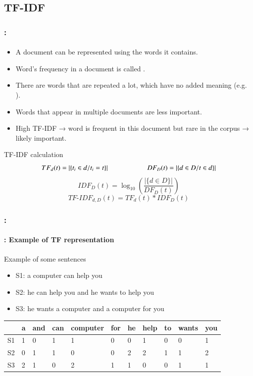 \documentclass[xcolor=table]{beamer}
\begin{document}
\subsection{TF-IDF}

\begin{frame}
	\frametitle{\insertshortsubtitle: \insertsection}
	\framesubtitle{\insertsubsection}

	\begin{itemize}
		\item A document can be represented using the words it contains.
		\item Word's frequency in a document is called .
		\item There are words that are repeated a lot, which have no added meaning (e.g. ).
		\item Words that appear in multiple documents are less important.
		\item High TF-IDF → word is frequent in this document but rare in the corpus → likely important.
	\end{itemize}
	
	\begin{block}{TF-IDF calculation}
		\[
		TF_d(t) =  |\{t_i \in d / t_i = t\}|
		\hskip2cm 
		DF_D(t) = |\{d \in D / t \in d\}|
		\]
		\[IDF_D(t) = \log_{10} \left( \frac{|\{d \in D\}|}{DF_D(t)} \right)\]
		\[TF\text{-}IDF_{d, D}(t) = TF_d(t) * IDF_D(t)\]
	\end{block}

\end{frame}


\begin{frame}
	\frametitle{\insertshortsubtitle: \insertsection}
	\framesubtitle{\insertsubsection: Example of TF representation}

	\begin{exampleblock}{Example of some sentences}
		\begin{itemize}
			\item S1: a computer can help you
			\item S2: he can help you and he wants to help you
			\item S3: he wants a computer and a computer for you
		\end{itemize}
	\end{exampleblock}
	
	\begin{center}
		\begin{tabular}{lllllllllll}
		\hline\hline
		& a & and & can & computer & for & he & help & to & wants & you \\
		\hline
		S1 & 1 & 0 & 1 & 1 & 0 & 0 & 1 & 0 & 0 & 1\\
		S2 & 0 & 1 & 1 & 0 & 0 & 2 & 2 & 1 & 1 & 2\\
		S3 & 2 & 1 & 0 & 2 & 1 & 1 & 0 & 0 & 1 & 1\\
		\hline\hline
	\end{tabular}
	\end{center}

\end{frame}
\end{document}
